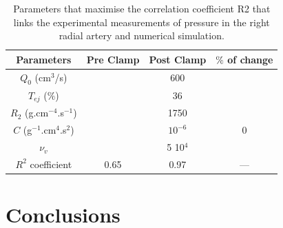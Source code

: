 \documentclass{config}
\begin{document}
\begin{table}[H]
\begin{center}
\begin{tabular}{|c|c|c|c|}
\hline
Parameters & Pre Clamp & Post Clamp & $\% $ of change \\
\hline 
$Q_0$ (cm$^3$/s)  & & 600 & \\ 
\hline 
$T_{ej} $ ($\%$) & & 36 & \\
\hline 
$R_2$  (g.cm$^{-4}$.s$^{-1}$) &  & 1750 & \\ 
\hline 
$C$ (g$^{-1}$.cm$^{4}$.s$^{2}$) &  & $10^{-6}$ & 0 \\
\hline
$\nu_v$ & & 5 10$^4$ & \\  
\hline
\hline 
$R^2$ coefficient & 0.65 & 0.97 & ---\\ 
\hline
\end{tabular}
\caption{Parameters that maximise the correlation coefficient R2 that links the experimental measurements of pressure in the right radial artery and numerical simulation. }
\label{final_results}
\end{center}
\end{table}

\section{Conclusions}

\nocite{*}


\end{document}

